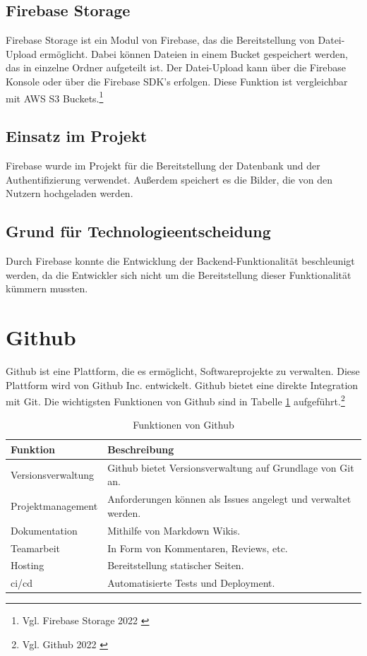 \subsection{Firebase Storage}
\label{sub:firebase-storage}

Firebase Storage ist ein Modul von Firebase, das die Bereitstellung von Datei-Upload ermöglicht.
Dabei können Dateien in einem Bucket gespeichert werden, das in einzelne Ordner aufgeteilt ist.
Der Datei-Upload kann über die Firebase Konsole oder über die Firebase SDK’s erfolgen.
Diese Funktion ist vergleichbar mit AWS S3 Buckets.\footnote{Vgl. Firebase Storage 2022 \cite{cloudstorage2022}}

\subsection{Einsatz im Projekt}
\label{sub:firebase-use}
Firebase wurde im Projekt für die Bereitstellung der Datenbank und der Authentifizierung verwendet.
Außerdem speichert es die Bilder, die von den Nutzern hochgeladen werden.


\subsection{Grund für Technologieentscheidung}
\label{sub:firebase-reason}
Durch Firebase konnte die Entwicklung der Backend-Funktionalität beschleunigt werden, da die Entwickler sich nicht um die Bereitstellung dieser Funktionalität kümmern mussten.

\section{Github}
\label{sec:github}

Github ist eine Plattform, die es ermöglicht, Softwareprojekte zu verwalten.
Diese Plattform wird von Github Inc. entwickelt. Github bietet eine direkte Integration mit Git.
Die wichtigsten Funktionen von Github sind in Tabelle \ref{tab:github} aufgeführt.\footnote{Vgl. Github 2022 \cite{github2022}}

\begin{table}[ht]
  \begin{tabularx}{\textwidth}{|l|X|}
  \hline
  \textbf{Funktion} & \textbf{Beschreibung} \\ \hline
  Versionsverwaltung & Github bietet Versionsverwaltung auf Grundlage von Git an. \\ \hline
  Projektmanagement & Anforderungen können als Issues angelegt und verwaltet werden. \\ \hline
  Dokumentation & Mithilfe von Markdown Wikis. \\ \hline
  Teamarbeit & In Form von Kommentaren, Reviews, etc. \\ \hline
  Hosting & Bereitstellung statischer Seiten. \\ \hline
  \gls{ci}/\gls{cd} & Automatisierte Tests und Deployment. \\ \hline
  \end{tabularx}
  \caption{Funktionen von Github}
  \label{tab:github}
\end{table}

